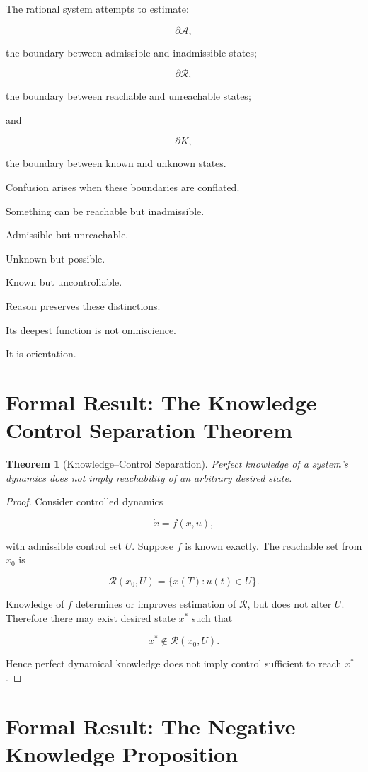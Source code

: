 \documentclass[11pt,oneside]{book}
\newtheorem{theorem}{Theorem}[chapter]
\theoremstyle{definition}
\theoremstyle{remark}
\newcommand{\A}{\mathcal{A}}
\newcommand{\R}{\mathcal{R}}
\begin{document}
The rational system attempts to estimate:

\[
\partial\A,
\]

the boundary between admissible and inadmissible states;

\[
\partial\R,
\]

the boundary between reachable and unreachable states;

and

\[
\partial K,
\]

the boundary between known and unknown states.

Confusion arises when these boundaries are conflated.

Something can be reachable but inadmissible.

Admissible but unreachable.

Unknown but possible.

Known but uncontrollable.

Reason preserves these distinctions.

Its deepest function is not omniscience.

It is orientation.

\section{Formal Result: The Knowledge--Control Separation Theorem}

\begin{theorem}[Knowledge--Control Separation]
Perfect knowledge of a system's dynamics does not imply reachability of an arbitrary desired state.
\end{theorem}

\begin{proof}
Consider controlled dynamics

\[
\dot{x}=f(x,u),
\]

with admissible control set \(U\). Suppose \(f\) is known exactly. The reachable set from \(x_0\) is

\[
\R(x_0,U)
=
\{
x(T):
u(t)\in U
\}.
\]

Knowledge of \(f\) determines or improves estimation of \(\R\), but does not alter \(U\). Therefore there may exist desired state \(x^\ast\) such that

\[
x^\ast\notin\R(x_0,U).
\]

Hence perfect dynamical knowledge does not imply control sufficient to reach \(x^\ast\).
\end{proof}

\section{Formal Result: The Negative Knowledge Proposition}
\end{document}
